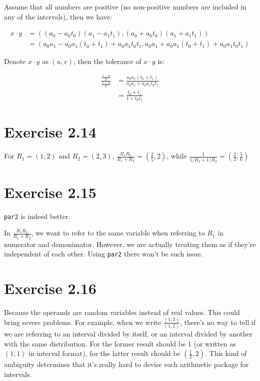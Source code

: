 \documentclass[../main.tex]{subfiles}
\begin{document}
Assume that all numbers are positive (no non-positive numbers
 are included in any of the intervals), then we have:

\begin{align*}
x \cdot y &= ((a_0 - a_0 t_0)(a_1 - a_1 t_1), (a_0 + a_0 t_0)(a_1 + a_1 t_1)) \\
&= (a_0 a_1 - a_0 a_1 (t_0 + t_1) + a_0 a_1 t_0 t_1, a_0 a_1 + a_0 a_1 (t_0 + t_1) + a_0 a_1 t_0 t_1)
\end{align*}

Denote $x \cdot y$ as $(u, v)$, then the tolerance of $x \cdot y$ is:

\begin{align*}
\frac{\frac{v-u}{2}}{\frac{v+u}{2}} &= \frac{a_0 a_1 (t_0 + t_1)}{a_0 a_1 + a_0 a_1 t_0 t_1} \\
&= \frac{t_0 + t_1}{1 + t_0 t_1}
\end{align*}

\section{Exercise 2.14}

For $R_1 = (1, 2)$ and $R_2 = (2, 3)$, $\frac{R_1 R_2}{R_1 + R_2} = (\frac{2}{5}, 2)$, while
$\frac{1}{1/R_1 + 1/R_2} = (\frac{2}{3}, \frac{5}{6})$

\section{Exercise 2.15}

\lstinline{par2} is indeed better.

In $\frac{R_1 R_2}{R_1 + R_2}$, we want to refer to the same variable
 when referring to $R_1$ in numerator and demonimator. However, we are
 actually treating them as if they're independent of each other. Using
 \lstinline{par2} there won't be such issue.

\section{Exercise 2.16}

Because the operands are random variables instead of real values. This
 could bring severe problems. For example, when we write $\frac{(1, 2)}{(1, 2)}$,
 there's no way to tell if we are referring to an interval divided by itself,
 or an interval divided by another with the same distribution. For the former
 result should be 1 (or written as $(1, 1)$ in interval format), for the latter
 result should be $(\frac{1}{2}, 2)$. This kind of ambiguity determines that
 it's really hard to devise such arithmetic package for intervals.
\end{document}
